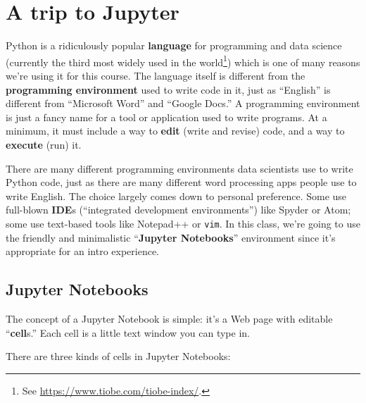 
\chapter{A trip to Jupyter}

\label{programmingEnvironment}
Python is a ridiculously popular \textbf{language} for programming and data
science (currently the third most widely used in the world\footnote{See
\url{https://www.tiobe.com/tiobe-index/}.}) which is one of many reasons we're
using it for this course. The language itself is different from the
\textbf{programming environment} used to write code in it, just as ``English''
is different from ``Microsoft Word'' and ``Google Docs.'' A programming
environment is just a fancy name for a tool or application used to write
programs. At a minimum, it must include a way to \textbf{edit} (write and
revise) code, and a way to \textbf{execute} (run) it.

There are many different programming environments data scientists use to write
Python code, just as there are many different word processing apps people use
to write English. The choice largely comes down to personal preference. Some
use full-blown \textbf{IDE}s (``integrated development environments'') like
Spyder or Atom; some use text-based tools like Notepad++ or \texttt{vim}. In
this class, we're going to use the friendly and minimalistic ``\textbf{Jupyter
Notebooks}'' environment since it's appropriate for an intro experience.

\section{Jupyter Notebooks}


The concept of a Jupyter Notebook is simple: it's a Web page with editable
``\textbf{cell}s.'' Each cell is a little text window you can type in.

\pagebreak
There are three kinds of cells in Jupyter Notebooks:
\vspace{-.15in}

